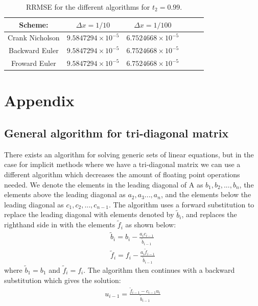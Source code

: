 \documentclass{article}
\begin{document}
\begin{table}[H]
\begin{center}
\caption{RRMSE for the different algorithms for $t_2=0.99$.}
\begin{tabular}{  |c|c|c|c|c|c| } \hline
Scheme:&	$\Delta x =1/10$&$\Delta x = 1/100$ \\ \hline
Crank Nicholson&$9.5847294\times 10^{-5}$&$6.7524668\times10^{-5}$\\ \hline
Backward Euler&$9.5847294\times 10^{-5}$&$6.7524668\times10^{-5}$\\ \hline
Froward Euler&$9.5847294\times 10^{-5}$&$6.7524668\times10^{-5}$\\ \hline
\end{tabular}
\label{tab:error2}
\end{center}
\end{table}

\clearpage

\section{Appendix}

\subsection{General algorithm for tri-diagonal matrix}

There exists an algorithm for solving generic sets of linear equations, but in the case for implicit methods where we have a tri-diagonal matrix we can use a different algorithm which decreases the amount of floating point operations needed. We denote the elements in the leading diagonal of A as $b_1, b_2, ..., b_n$, the elements above the leading diagonal as $a_2, a_3 ..., a_n$, and the elements below the leading diagonal as $c_1, c_2, ..., c_{n-1}$. The algorithm uses a forward substitution to replace the leading diagonal with elements denoted by $\tilde{b}_i$, and replaces the righthand side in with the elements $\tilde{f}_i$ as shown below\cite{98}:
\begin{align*}
\tilde{b}_i=b_i-\frac{a_ic_{i-1}}{\tilde{b}_{i-1}} \\
\tilde{f}_i=f_i-\frac{a_i\tilde{f}_{i-1}}{\tilde{b}_{i-1}}
\end{align*}
where $\tilde{b}_1=b_1$ and $\tilde{f}_i=f_i$. The algorithm then continues with a backward substitution which gives the solution:
\begin{align}
u_{i-1}=\frac{\tilde{f}_{i-1}-c_{i-1}u_i}{\tilde{b}_{i-1}}
\end{align}
\\
\end{document}
